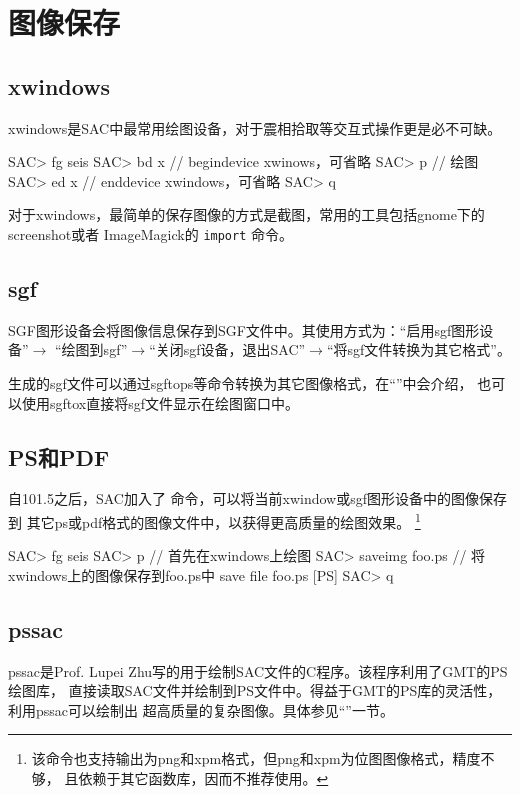 \section{图像保存}
\label{sec:save-image}

\subsection{xwindows}
xwindows是SAC中最常用绘图设备，对于震相拾取等交互式操作更是必不可缺。
\begin{SACCode}
SAC> fg seis
SAC> bd x       // begindevice xwinows，可省略
SAC> p          // 绘图
SAC> ed x       // enddevice xwindows，可省略
SAC> q
\end{SACCode}

对于xwindows，最简单的保存图像的方式是截图，常用的工具包括gnome下的screenshot或者
ImageMagick的 \texttt{import} 命令。

\subsection{sgf}
SGF图形设备会将图像信息保存到SGF文件中。其使用方式为：``启用sgf图形设备''$\rightarrow$
``绘图到sgf''$\rightarrow$``关闭sgf设备，退出SAC''$\rightarrow$``将sgf文件转换为其它格式''。

生成的sgf文件可以通过sgftops等命令转换为其它图像格式，在``''中会介绍，
也可以使用sgftox直接将sgf文件显示在绘图窗口中。

\subsection{PS和PDF}
自101.5之后，SAC加入了  命令，可以将当前xwindow或sgf图形设备中的图像保存到
其它ps或pdf格式的图像文件中，以获得更高质量的绘图效果。
\footnote{该命令也支持输出为png和xpm格式，但png和xpm为位图图像格式，精度不够，
且依赖于其它函数库，因而不推荐使用。}

\begin{SACCode}
SAC> fg seis
SAC> p                      // 首先在xwindows上绘图
SAC> saveimg foo.ps         // 将xwindows上的图像保存到foo.ps中
save file foo.ps [PS]
SAC> q
\end{SACCode}

\subsection{pssac}
pssac是Prof. Lupei Zhu写的用于绘制SAC文件的C程序。该程序利用了GMT的PS绘图库，
直接读取SAC文件并绘制到PS文件中。得益于GMT的PS库的灵活性，利用pssac可以绘制出
超高质量的复杂图像。具体参见``''一节。

